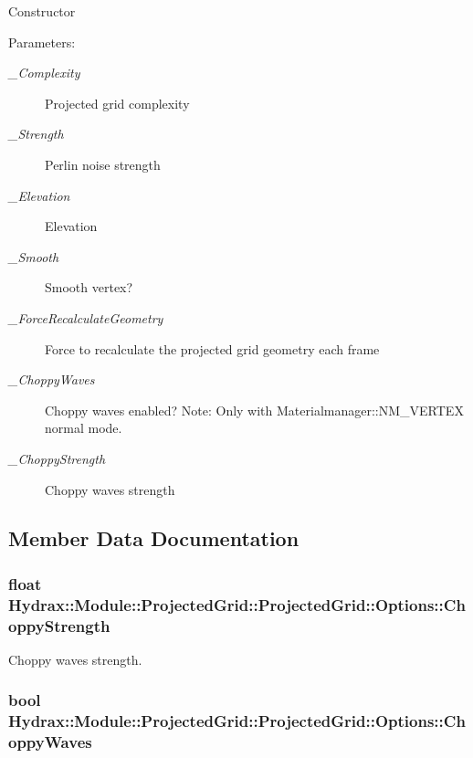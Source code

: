 Constructor \begin{Desc}
\item[Parameters:]
\begin{description}
\item[{\em \_\-Complexity}]Projected grid complexity \item[{\em \_\-Strength}]Perlin noise strength \item[{\em \_\-Elevation}]Elevation \item[{\em \_\-Smooth}]Smooth vertex? \item[{\em \_\-ForceRecalculateGeometry}]Force to recalculate the projected grid geometry each frame \item[{\em \_\-ChoppyWaves}]Choppy waves enabled? Note: Only with Materialmanager::NM\_\-VERTEX normal mode. \item[{\em \_\-ChoppyStrength}]Choppy waves strength \end{description}
\end{Desc}


\subsection{Member Data Documentation}
\hypertarget{struct_hydrax_1_1_module_1_1_projected_grid_1_1_options_d4124f7740eb85dfb8ea0c903c7eb846}{
\subsubsection[{ChoppyStrength}]{\setlength{\rightskip}{0pt plus 5cm}float Hydrax::Module::ProjectedGrid::ProjectedGrid::Options::ChoppyStrength}}
\label{struct_hydrax_1_1_module_1_1_projected_grid_1_1_options_d4124f7740eb85dfb8ea0c903c7eb846}


Choppy waves strength. 

\hypertarget{struct_hydrax_1_1_module_1_1_projected_grid_1_1_options_24d50dfd5e1e853394139f1a3e8e5ca9}{
\subsubsection[{ChoppyWaves}]{\setlength{\rightskip}{0pt plus 5cm}bool Hydrax::Module::ProjectedGrid::ProjectedGrid::Options::ChoppyWaves}}
\label{struct_hydrax_1_1_module_1_1_projected_grid_1_1_options_24d50dfd5e1e853394139f1a3e8e5ca9}


